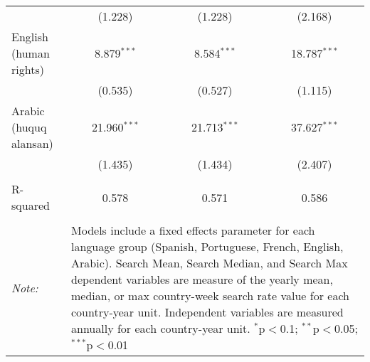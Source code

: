 \begin{table}[!htbp]
\begin{tabular}{@{\extracolsep{5pt}}lccc}
  & (1.228) & (1.228) & (2.168) \\ 
  English (human rights) & 8.879$^{***}$ & 8.584$^{***}$ & 18.787$^{***}$ \\ 
  & (0.535) & (0.527) & (1.115) \\ 
  Arabic (huquq alansan) & 21.960$^{***}$ & 21.713$^{***}$ & 37.627$^{***}$ \\ 
  & (1.435) & (1.434) & (2.407) \\ 
 \hline \\[-1.8ex] 
R-squared  & 0.578 & 0.571 & 0.586 \\ 
\hline 
\hline \\[-1.8ex] 
\textit{Note:}  & \multicolumn{3}{l}{\parbox[t]{8cm}{Models include a fixed effects parameter for each language group (Spanish, Portuguese, French, English, Arabic). Search Mean, Search Median, and Search Max dependent variables are measure of the yearly mean, median, or max country-week search rate value for each country-year unit. Independent variables are measured annually for each country-year unit. $^{*}$p$<$0.1; $^{**}$p$<$0.05; $^{***}$p$<$0.01}} \\ 
\end{tabular} 
\end{table} 
